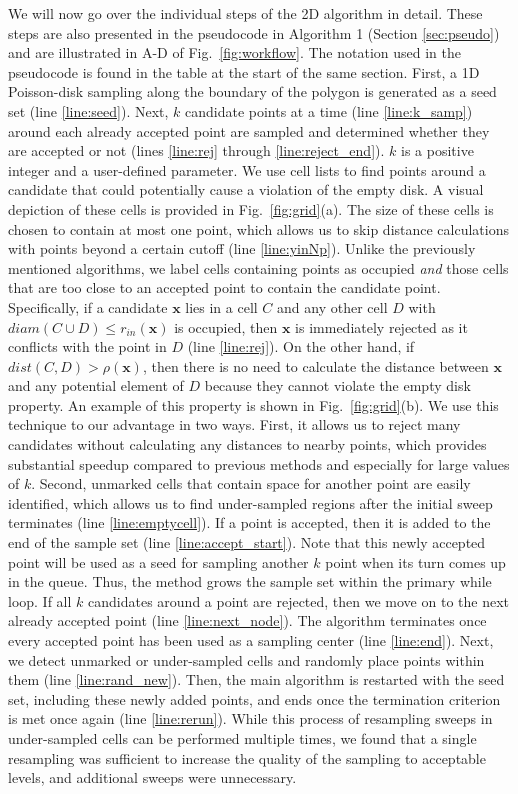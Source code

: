 \documentclass[preprint, 10pt]{elsarticle}
\newcommand{\vx}{{\mathbf x}}
\theoremstyle{definition}
\theoremstyle{remark}
\begin{document}
We will now go over the individual steps of the 2D algorithm in detail. 
These steps are also presented in the pseudocode in Algorithm 1 (Section \ref{sec:pseudo}) and are illustrated in A-D of Fig.~\ref{fig:workflow}. 
The notation used in the pseudocode is found in the table at the start of the same section. 
First, a 1D Poisson-disk sampling along the boundary of the polygon is generated as a seed set (line \ref{line:seed}). 
Next, $k$ candidate points at a time (line \ref{line:k_samp}) around each already accepted point are sampled and determined whether they are accepted or not (lines \ref{line:rej} through \ref{line:reject_end}). 
$k$ is a positive integer and a user-defined parameter. 
We use cell lists to find points around a candidate that could potentially cause a violation of the empty disk. %
A visual depiction of these cells is provided in Fig.~\ref{fig:grid}(a). 
The size of these cells is chosen to contain at most one point, which allows us to skip distance calculations with points beyond a certain cutoff (line \ref{line:yinNp}). 
Unlike the previously mentioned algorithms, we label cells containing points as occupied \textit{and} those cells that are too close to an accepted point to contain the candidate point.  
Specifically, if a candidate $\vx$ lies in a cell $C$ and any other cell $D$ with $diam(C\cup D)\le r_{in}(\vx)$ is occupied, then $\vx$ is immediately rejected as it conflicts with the point in $D$ (line \ref{line:rej}). 
On the other hand, if $dist(C, D)>\rho(\vx)$, then there is no need to calculate the distance between $\vx$ and any potential element of $D$ because they cannot violate the empty disk property. 
An example of this property is shown in Fig.~\ref{fig:grid}(b).
We use this technique to our advantage in two ways.
First, it allows us to reject many candidates without calculating any distances to nearby points, which provides substantial speedup compared to previous methods and especially for large values of $k$.
Second, unmarked cells that contain space for another point are easily identified, which allows us to find under-sampled regions after the initial sweep terminates (line \ref{line:emptycell}). 
If a point is accepted, then it is added to the end of the sample set (line \ref{line:accept_start}).
Note that this newly accepted point will be used as a seed for sampling another $k$ point when its turn comes up in the queue. 
Thus, the method grows the sample set within the primary while loop.
If all $k$ candidates around a point are rejected, then we move on to the next already accepted point (line \ref{line:next_node}). 
The algorithm terminates once every accepted point has been used as a sampling center (line \ref{line:end}).
Next, we detect unmarked or under-sampled cells and randomly place points within them (line \ref{line:rand_new}). 
Then, the main algorithm is restarted with the seed set, including these newly added points, and ends once the termination criterion is met once again (line \ref{line:rerun}). 
While this process of resampling sweeps in under-sampled cells can be performed multiple times, we found that a single resampling was sufficient to increase the quality of the sampling to acceptable levels, and additional sweeps were unnecessary. 
\end{document}
